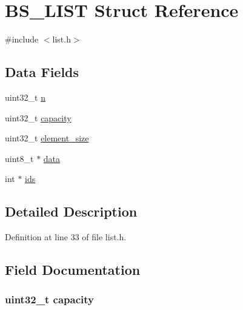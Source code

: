 \hypertarget{struct_b_s___l_i_s_t}{\section{B\+S\+\_\+\+L\+I\+S\+T Struct Reference}
\label{struct_b_s___l_i_s_t}
}


{\ttfamily \#include $<$list.\+h$>$}

\subsection*{Data Fields}
\begin{DoxyCompactItemize}
\item 
uint32\+\_\+t \hyperlink{struct_b_s___l_i_s_t_a3d8a9527a2ee4a7ebf59175650142e75}{n}
\item 
uint32\+\_\+t \hyperlink{struct_b_s___l_i_s_t_a391c992c66c3e5540265a85ec2b9216a}{capacity}
\item 
uint32\+\_\+t \hyperlink{struct_b_s___l_i_s_t_a4ff545e181548785b8e257d2a8ac857a}{element\+\_\+size}
\item 
uint8\+\_\+t $\ast$ \hyperlink{struct_b_s___l_i_s_t_abe222f6d3581e7920dcad5306cc906a8}{data}
\item 
int $\ast$ \hyperlink{struct_b_s___l_i_s_t_a6081d5fc46a8899b4beb60b0df7dd190}{ids}
\end{DoxyCompactItemize}


\subsection{Detailed Description}


Definition at line 33 of file list.\+h.



\subsection{Field Documentation}
\hypertarget{struct_b_s___l_i_s_t_a391c992c66c3e5540265a85ec2b9216a}{
\subsubsection[{capacity}]{\setlength{\rightskip}{0pt plus 5cm}uint32\+\_\+t capacity}}\label{struct_b_s___l_i_s_t_a391c992c66c3e5540265a85ec2b9216a}


